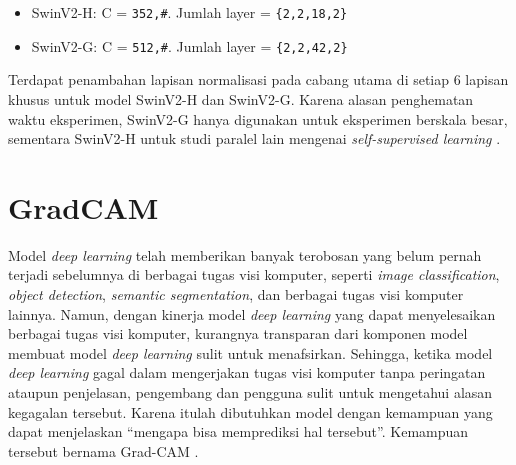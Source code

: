 \begin{itemize}[nolistsep]

  \item SwinV2-H: C = \verb|352,#|. Jumlah layer = \verb|{2,2,18,2}|

  \item SwinV2-G: C = \verb|512,#|. Jumlah layer = \verb|{2,2,42,2}|

\end{itemize}

Terdapat penambahan lapisan normalisasi pada cabang utama di setiap 6 lapisan khusus untuk model SwinV2-H dan SwinV2-G. Karena alasan penghematan waktu eksperimen, \linebreak SwinV2-G hanya digunakan untuk eksperimen 
berskala besar, sementara SwinV2-H untuk studi paralel lain mengenai \emph{self-supervised learning} \parencite{Liuv22021}.


\section{GradCAM}
\label{sec:gradcam}

Model \emph{deep learning} telah memberikan banyak terobosan yang belum pernah terjadi \linebreak sebelumnya di berbagai tugas visi komputer, seperti \emph{image classification}, \emph{object detection}, \emph{semantic segmentation}, 
dan berbagai tugas visi komputer lainnya. Namun, dengan kinerja model \emph{deep learning} yang dapat menyelesaikan berbagai tugas visi komputer, kurangnya transparan dari komponen model membuat model \emph{deep learning} 
sulit untuk menafsirkan. Sehingga, ketika model \emph{deep learning} gagal dalam mengerjakan tugas visi komputer tanpa peringatan ataupun penjelasan, pengembang dan pengguna 
sulit untuk mengetahui alasan kegagalan tersebut. \linebreak Karena itulah dibutuhkan model dengan kemampuan yang dapat menjelaskan “mengapa bisa memprediksi hal tersebut”. Kemampuan 
tersebut bernama Grad-CAM \parencite{Selvaraju2019}.

